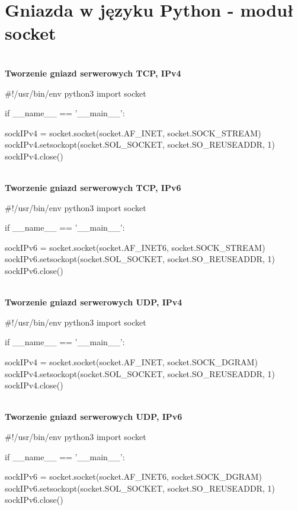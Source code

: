 \section*{Gniazda w języku Python - moduł socket} \mbox{}\\

\noindent \textbf{Tworzenie gniazd serwerowych TCP, IPv4}

\begin{code}
#!/usr/bin/env python3
import socket

if __name__ == '__main__':

	sockIPv4 = socket.socket(socket.AF_INET, socket.SOCK_STREAM)
	sockIPv4.setsockopt(socket.SOL_SOCKET, socket.SO_REUSEADDR, 1)
	sockIPv4.close()
\end{code} \mbox{}\\

\noindent \textbf{Tworzenie gniazd serwerowych TCP, IPv6}

\begin{code}
#!/usr/bin/env python3
import socket

if __name__ == '__main__':

	sockIPv6 = socket.socket(socket.AF_INET6, socket.SOCK_STREAM)
	sockIPv6.setsockopt(socket.SOL_SOCKET, socket.SO_REUSEADDR, 1)
	sockIPv6.close()
\end{code} \mbox{}\\

\noindent \textbf{Tworzenie gniazd serwerowych UDP, IPv4}

\begin{code}
#!/usr/bin/env python3
import socket 

if __name__ == '__main__':

	sockIPv4 = socket.socket(socket.AF_INET,  socket.SOCK_DGRAM)
	sockIPv4.setsockopt(socket.SOL_SOCKET, socket.SO_REUSEADDR, 1)
	sockIPv4.close()
\end{code}\mbox{}\\

\noindent \textbf{Tworzenie gniazd serwerowych UDP, IPv6}

\begin{code}
#!/usr/bin/env python3
import socket 

if __name__ == '__main__':

	sockIPv6 = socket.socket(socket.AF_INET6,  socket.SOCK_DGRAM)
	sockIPv6.setsockopt(socket.SOL_SOCKET, socket.SO_REUSEADDR, 1)
	sockIPv6.close()
\end{code}\mbox{}\\

